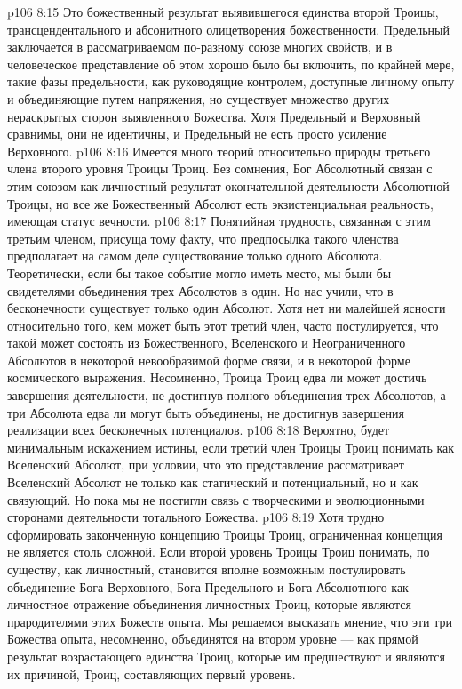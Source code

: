 \vs p106 8:15 \bibnobreakspace {} Это божественный результат выявившегося единства второй Троицы, трансцендентального и абсонитного олицетворения божественности. Предельный заключается в рассматриваемом по\hyp{}разному союзе многих свойств, и в человеческое представление об этом хорошо было бы включить, по крайней мере, такие фазы предельности, как руководящие контролем, доступные личному опыту и объединяющие путем напряжения, но существует множество других нераскрытых сторон выявленного Божества. Хотя Предельный и Верховный сравнимы, они не идентичны, и Предельный не есть просто усиление Верховного.
\vs p106 8:16 \bibnobreakspace {} Имеется много теорий относительно природы третьего члена второго уровня Троицы Троиц. Без сомнения, Бог Абсолютный связан с этим союзом как личностный результат окончательной деятельности Абсолютной Троицы, но все же Божественный Абсолют есть экзистенциальная реальность, имеющая статус вечности.
\vs p106 8:17 Понятийная трудность, связанная с этим третьим членом, присуща тому факту, что предпосылка такого членства предполагает на самом деле существование только одного Абсолюта. Теоретически, если бы такое событие могло иметь место, мы были бы свидетелями  объединения трех Абсолютов в один. Но нас учили, что в бесконечности  существует только один Абсолют. Хотя нет ни малейшей ясности относительно того, кем может быть этот третий член, часто постулируется, что такой может состоять из Божественного, Вселенского и Неограниченного Абсолютов в некоторой невообразимой форме связи, и в некоторой форме космического выражения. Несомненно, Троица Троиц едва ли может достичь завершения деятельности, не достигнув полного объединения трех Абсолютов, а три Абсолюта едва ли могут быть объединены, не достигнув завершения реализации всех бесконечных потенциалов.
\vs p106 8:18 Вероятно, будет минимальным искажением истины, если третий член Троицы Троиц понимать как Вселенский Абсолют, при условии, что это представление рассматривает Вселенский Абсолют не только как статический и потенциальный, но и как связующий. Но пока мы не постигли связь с творческими и эволюционными сторонами деятельности тотального Божества.
\vs p106 8:19 Хотя трудно сформировать законченную концепцию Троицы Троиц, ограниченная концепция не является столь сложной. Если второй уровень Троицы Троиц понимать, по существу, как личностный, становится вполне возможным постулировать объединение Бога Верховного, Бога Предельного и Бога Абсолютного как личностное отражение объединения личностных Троиц, которые являются прародителями этих Божеств опыта. Мы решаемся высказать мнение, что эти три Божества опыта, несомненно, объединятся на втором уровне --- как прямой результат возрастающего единства Троиц, которые им предшествуют и являются их причиной, Троиц, составляющих первый уровень.
